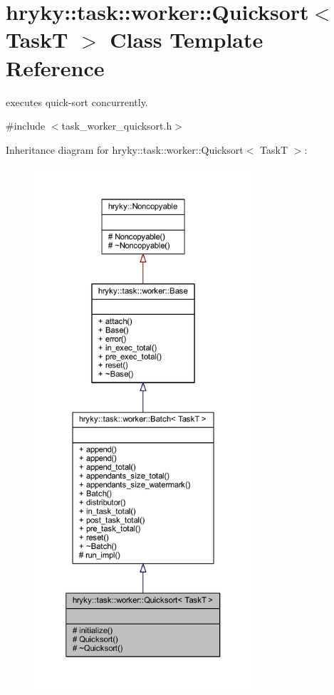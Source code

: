 \hypertarget{classhryky_1_1task_1_1worker_1_1_quicksort}{\section{hryky\-:\-:task\-:\-:worker\-:\-:Quicksort$<$ Task\-T $>$ Class Template Reference}
\label{classhryky_1_1task_1_1worker_1_1_quicksort}
}


executes quick-\/sort concurrently.  




{\ttfamily \#include $<$task\-\_\-worker\-\_\-quicksort.\-h$>$}



Inheritance diagram for hryky\-:\-:task\-:\-:worker\-:\-:Quicksort$<$ Task\-T $>$\-:
\nopagebreak
\begin{figure}[H]
\begin{center}
\leavevmode
\includegraphics[height=550pt]{classhryky_1_1task_1_1worker_1_1_quicksort__inherit__graph}
\end{center}
\end{figure}
